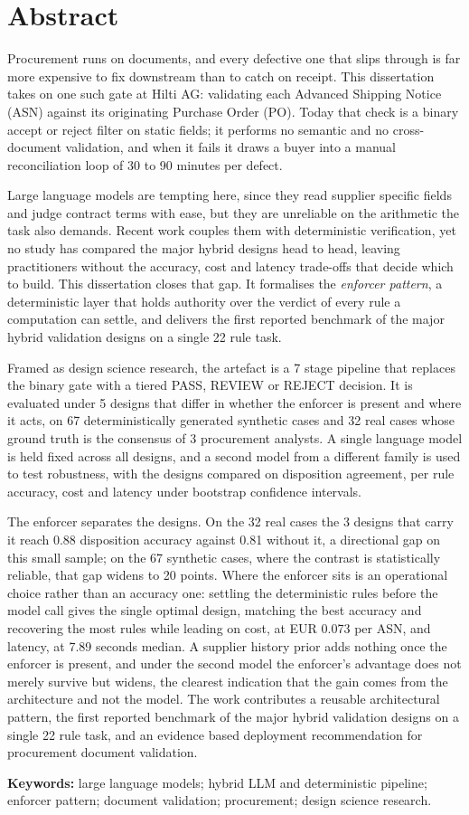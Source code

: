 \chapter*{Abstract}

Procurement runs on documents, and every defective one that slips through is far more expensive to fix downstream than to catch on receipt. This dissertation takes on one such gate at Hilti AG: validating each Advanced Shipping Notice (ASN) against its originating Purchase Order (PO). Today that check is a binary accept or reject filter on static fields; it performs no semantic and no cross-document validation, and when it fails it draws a buyer into a manual reconciliation loop of 30 to 90 minutes per defect.

Large language models are tempting here, since they read supplier specific fields and judge contract terms with ease, but they are unreliable on the arithmetic the task also demands. Recent work couples them with deterministic verification, yet no study has compared the major hybrid designs head to head, leaving practitioners without the accuracy, cost and latency trade-offs that decide which to build. This dissertation closes that gap. It formalises the \emph{enforcer pattern}, a deterministic layer that holds authority over the verdict of every rule a computation can settle, and delivers the first reported benchmark of the major hybrid validation designs on a single 22 rule task.

Framed as design science research, the artefact is a 7 stage pipeline that replaces the binary gate with a tiered PASS, REVIEW or REJECT decision. It is evaluated under 5 designs that differ in whether the enforcer is present and where it acts, on 67 deterministically generated synthetic cases and 32 real cases whose ground truth is the consensus of 3 procurement analysts. A single language model is held fixed across all designs, and a second model from a different family is used to test robustness, with the designs compared on disposition agreement, per rule accuracy, cost and latency under bootstrap confidence intervals.

The enforcer separates the designs. On the 32 real cases the 3 designs that carry it reach 0.88 disposition accuracy against 0.81 without it, a directional gap on this small sample; on the 67 synthetic cases, where the contrast is statistically reliable, that gap widens to 20 points. Where the enforcer sits is an operational choice rather than an accuracy one: settling the deterministic rules before the model call gives the single optimal design, matching the best accuracy and recovering the most rules while leading on cost, at EUR 0.073 per ASN, and latency, at 7.89 seconds median. A supplier history prior adds nothing once the enforcer is present, and under the second model the enforcer's advantage does not merely survive but widens, the clearest indication that the gain comes from the architecture and not the model. The work contributes a reusable architectural pattern, the first reported benchmark of the major hybrid validation designs on a single 22 rule task, and an evidence based deployment recommendation for procurement document validation.

\vspace{2em}
\noindent\textbf{Keywords:} large language models; hybrid LLM and deterministic pipeline; enforcer pattern; document validation; procurement; design science research.
